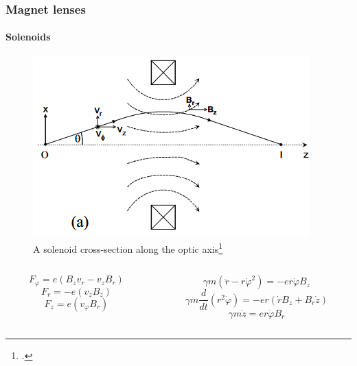 \begin{frame}
  \frametitle{Magnet lenses}
  \framesubtitle{Solenoids}
  \rfn
  \begin{figure}
    \includegraphics[width=.5\textwidth]{El_traj_in_B1.png}
    \caption{A solenoid cross-section along the optic axis\footcite{Egerton}}
  \end{figure}
  \begin{scriptsize}
  \begin{columns}
    \begin{column}{0.45\textwidth}
      \begin{equation}
        F_{\varphi}=e\left(B_{z}v_{r} - v_{z}B_{r}\right)
      \end{equation}
      \begin{equation}
        F_{r}=-e\left(v_{z}B_{z}\right)
      \end{equation}
      \begin{equation}
        F_{z}=e\left(v_{\varphi}B_{r}\right)
      \end{equation}
    \end{column}
    \begin{column}{0.55\textwidth}
      \begin{equation}
        \gamma m\left(\ddot{r}-r\dot{\varphi}^{2}\right)=-er\dot{\varphi}B_{z}
      \end{equation}
      \begin{equation}
        \gamma m\frac{d}{dt}\left(r^{2}\dot{\varphi}\right)=-er(\dot rB_{z}+B_{r}\dot{z})
      \end{equation}
      \begin{equation}
        \gamma m\ddot{z}=er\dot{\varphi}B_{r}
      \end{equation}
    \end{column}
  \end{columns}
  \end{scriptsize}
\end{frame}

